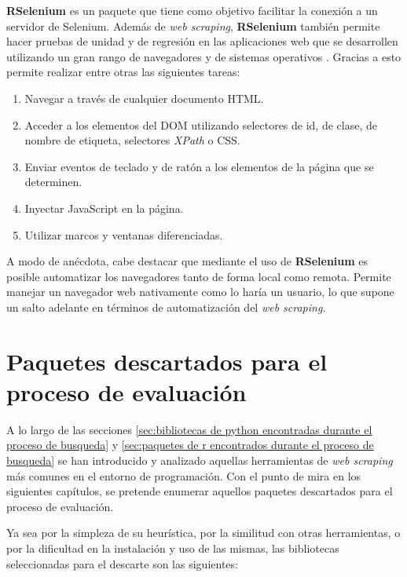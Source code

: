 \textbf{RSelenium} \cite{rselenium-cran} es un paquete que tiene como objetivo facilitar la conexión a un 
servidor de Selenium. Además de \emph{web scraping}, \textbf{RSelenium} también permite hacer pruebas de 
unidad y de regresión en las aplicaciones web que se desarrollen utilizando un gran rango de navegadores 
y de sistemas operativos \cite{tfg-daniel-francisco-lopez}. Gracias a esto permite realizar entre otras 
las siguientes tareas:

\begin{enumerate}
  \item Navegar a través de cualquier documento HTML.
  \item Acceder a los elementos del DOM utilizando selectores de id, de clase, de nombre de etiqueta, 
  selectores \emph{XPath} o CSS.
  \item Enviar eventos de teclado y de ratón a los elementos de la página que se determinen.
  \item Inyectar JavaScript en la página.
  \item Utilizar marcos y ventanas diferenciadas.
\end{enumerate}

A modo de anécdota, cabe destacar que mediante el uso de \textbf{RSelenium} es posible automatizar los
navegadores tanto de forma local como remota. Permite manejar un navegador web nativamente como lo haría
un usuario, lo que supone un salto adelante en términos de automatización del \emph{web scraping}.

\section{Paquetes descartados para el proceso de evaluación}
\label{sec:paquetes descartados para el proceso de evaluacion}

A lo largo de las secciones \ref{sec:bibliotecas de python encontradas durante el proceso de busqueda} y
\ref{sec:paquetes de r encontrados durante el proceso de busqueda} se han introducido y analizado
aquellas herramientas de \emph{web scraping} más comunes en el entorno de programación. Con el punto de 
mira en los siguientes capítulos, se pretende enumerar aquellos paquetes descartados para el proceso de 
evaluación.

Ya sea por la simpleza de su heurística, por la similitud con otras herramientas, o por la dificultad en 
la instalación y uso de las mismas, las bibliotecas seleccionadas para el descarte son las siguientes:

